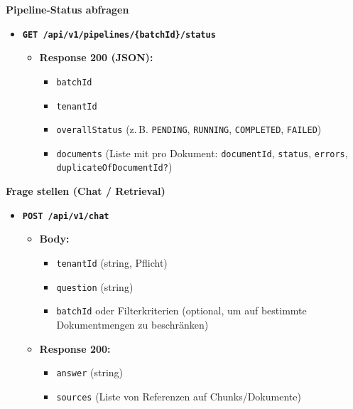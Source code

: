 \textbf{Pipeline-Status abfragen}

\begin{itemize}
\tightlist
\item
  \textbf{\texttt{GET\ /api/v1/pipelines/\{batchId\}/status}}

  \begin{itemize}
  \tightlist
  \item
    \textbf{Response 200 (JSON):}

    \begin{itemize}
    \tightlist
    \item
      \texttt{batchId}
    \item
      \texttt{tenantId}
    \item
      \texttt{overallStatus} (z.\,B. \texttt{PENDING}, \texttt{RUNNING},
      \texttt{COMPLETED}, \texttt{FAILED})
    \item
      \texttt{documents} (Liste mit pro Dokument: \texttt{documentId},
      \texttt{status}, \texttt{errors}, \texttt{duplicateOfDocumentId?})
    \end{itemize}
  \end{itemize}
\end{itemize}

\textbf{Frage stellen (Chat / Retrieval)}

\begin{itemize}
\tightlist
\item
  \textbf{\texttt{POST\ /api/v1/chat}}

  \begin{itemize}
  \tightlist
  \item
    \textbf{Body:}

    \begin{itemize}
    \tightlist
    \item
      \texttt{tenantId} (string, Pflicht)
    \item
      \texttt{question} (string)
    \item
      \texttt{batchId} oder Filterkriterien (optional, um auf bestimmte
      Dokumentmengen zu beschränken)
    \end{itemize}
  \item
    \textbf{Response 200:}

    \begin{itemize}
    \tightlist
    \item
      \texttt{answer} (string)
    \item
      \texttt{sources} (Liste von Referenzen auf Chunks/Dokumente)
    \end{itemize}
  \end{itemize}
\end{itemize}

